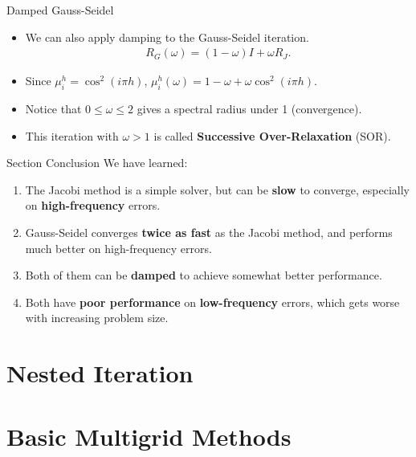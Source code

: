 \documentclass{beamer}
\begin{document}
\begin{frame}{Damped Gauss-Seidel}
 \begin{itemize}
  \item We can also apply damping to the Gauss-Seidel iteration.
  \begin{align}
   R_G(\omega) = (1-\omega)I + \omega R_J.
  \end{align}
  \item Since $\mu_i^h = \cos^2(i\pi h)$, $\mu_i^h(\omega) = 1 - \omega + \omega \cos^2(i\pi h)$.
  \item Notice that $0 \leq \omega \leq 2$ gives a spectral radius under 1 (convergence).
  \item This iteration with $\omega > 1$ is called
        \textbf{Successive Over-Relaxation} (SOR).
 \end{itemize}
\end{frame}

\begin{frame}{Section Conclusion}
 We have learned:
 \begin{enumerate}
  \item The Jacobi method is a simple solver, but can be \textbf{slow} to converge,
        especially on \textbf{high-frequency} errors.
  \item Gauss-Seidel converges \textbf{twice as fast} as the Jacobi method, and
        performs much better on high-frequency errors.
  \item Both of them can be \textbf{damped} to achieve somewhat better performance.
  \item Both have \textbf{poor performance} on \textbf{low-frequency} errors, which gets
        worse with increasing problem size.
 \end{enumerate}
\end{frame}

\section{Nested Iteration}%

\section{Basic Multigrid Methods}%
\end{document}
